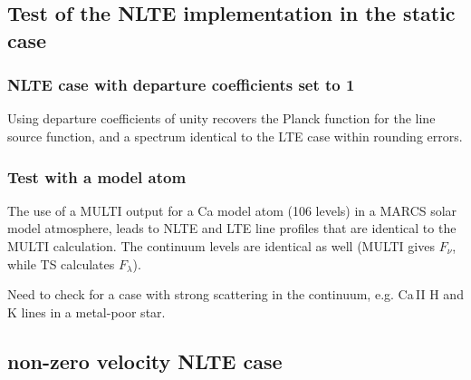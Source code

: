 \documentclass[a4paper,12pt]{article}
\begin{document}
\subsection{Test of the NLTE implementation in the static case}

\subsubsection{NLTE case with departure coefficients set to 1}

Using departure coefficients of unity recovers the Planck function for the line source function, and a spectrum identical 
to the LTE case within rounding errors.

\subsubsection{Test with a model atom}

The use of a MULTI output for a Ca model atom (106 levels) in a MARCS solar model atmosphere, leads  to
NLTE and LTE line profiles that are identical to the MULTI calculation. The continuum levels are identical as well (MULTI
gives $F_\nu$, while TS calculates $F_\lambda$).


Need to check for a case with strong scattering in the continuum, e.g. Ca\,II H and K lines in a metal-poor star.


\subsection{non-zero velocity NLTE case}
\end{document}
